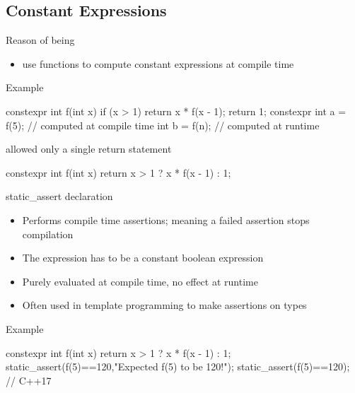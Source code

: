 \subsection[cstexpr]{Constant Expressions}

\begin{frame}[fragile]
  \begin{block}{Reason of being}
    \begin{itemize}
    \item use functions to compute constant expressions at compile time
    \end{itemize}
  \end{block}
  \pause
  \begin{exampleblock}{Example}
    \begin{cppcode*}{}
      constexpr int f(int x) {
        if (x > 1) return x * f(x - 1);
        return 1;
      }
      constexpr int a = f(5); // computed at compile time
      int b = f(n); // computed at runtime
    \end{cppcode*}
  \end{exampleblock}
  \pause
  \begin{block}{ allowed only a single return statement}
    \begin{cppcode*}{}
      constexpr int f(int x) {
        return x > 1 ? x * f(x - 1) : 1;
      }
    \end{cppcode*}
  \end{block}
\end{frame}

\begin{frame}[fragile]
  \begin{block}{static\_assert declaration}
    \begin{itemize}
    \item Performs compile time assertions; meaning a failed assertion stops compilation
    \item The expression has to be a constant boolean expression
    \item Purely evaluated at compile time, no effect at runtime
    \item Often used in template programming to make assertions on types
    \end{itemize}
  \end{block}
  \pause
  \begin{exampleblock}{Example}
    \begin{cppcode*}{}
      constexpr int f(int x) {
        return x > 1 ? x * f(x - 1) : 1;
      }
      static_assert(f(5)==120,"Expected f(5) to be 120!");
      static_assert(f(5)==120); // C++17
    \end{cppcode*}
  \end{exampleblock}
\end{frame}

